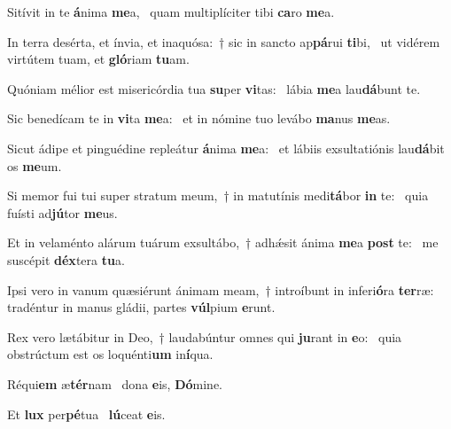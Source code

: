 \item Sitívit in te \textbf{á}nima \textbf{me}a,~\psstar{} quam multiplíciter tibi \textbf{ca}ro \textbf{me}a.

\item In terra desérta, et ínvia, et inaquósa:~† sic in sancto ap\textbf{pá}rui \textbf{ti}bi,~\psstar{} ut vidérem virtútem tuam, et \textbf{gló}riam \textbf{tu}am.

\item Quóniam mélior est misericórdia tua \textbf{su}per \textbf{vi}tas:~\psstar{} lábia \textbf{me}a lau\textbf{dá}bunt te.

\item Sic benedícam te in \textbf{vi}ta \textbf{me}a:~\psstar{} et in nómine tuo levábo \textbf{ma}nus \textbf{me}as.

\item Sicut ádipe et pinguédine repleátur \textbf{á}nima \textbf{me}a:~\psstar{} et lábiis exsultatiónis lau\textbf{dá}bit os \textbf{me}um.

\item Si memor fui tui super stratum meum,~† in matutínis medi\textbf{tá}bor \textbf{in} te:~\psstar{} quia fuísti ad\textbf{jú}tor \textbf{me}us.

\item Et in velaménto alárum tuárum exsultábo,~† adhǽsit ánima \textbf{me}a \textbf{post} te:~\psstar{} me suscépit \textbf{déx}tera \textbf{tu}a.

\item Ipsi vero in vanum quæsiérunt ánimam meam,~† introíbunt in inferi\textbf{ó}ra \textbf{ter}ræ:~\psstar{} tradéntur in manus gládii, partes \textbf{vúl}pium \textbf{e}runt.

\item Rex vero lætábitur in Deo,~† laudabúntur omnes qui \textbf{ju}rant in \textbf{e}o:~\psstar{} quia obstrúctum est os loquénti\textbf{um} in\textbf{í}qua.

\item Réqui\textbf{em} æ\textbf{tér}nam~\psstar{} dona \textbf{e}is, \textbf{Dó}mine.

\item Et \textbf{lux} per\textbf{pé}tua~\psstar{} \textbf{lú}ceat \textbf{e}is.